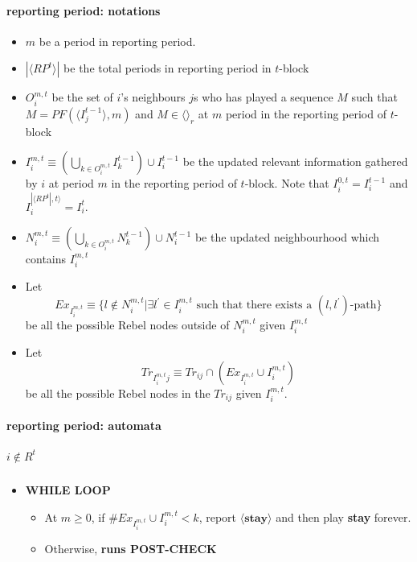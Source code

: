 \documentclass[12pt,letter]{article}
\theoremstyle{definition}
\theoremstyle{remark}
\theoremstyle{claim}
\begin{document}
\paragraph{reporting period: notations}
\begin{itemize}
\item $m$ be a period in reporting period.
\item $|\langle RP^t \rangle|$ be the total periods in reporting period in $t$-block
\item $O^{m,t}_i$ be the set of $i$'s neighbours $j$s who has played a sequence $M$ such that $M=PF(\langle I^{t-1}_j \rangle,m)$ and $M \in \langle \rangle_r$ at $m$ period in the reporting period of $t$-block 
\item $I^{m,t}_i\equiv (\bigcup_{k\in O^{m,t}_i} I^{t-1}_k)\cup I^{t-1}_i$ be the updated relevant information gathered by $i$ at period $m$ in the reporting period of $t$-block. Note that $I^{0,t}_i=I^{t-1}_i$ and $I^{|\langle RP^t|,t \rangle}_i=I^{t}_i$.
\item $N^{m,t}_i\equiv (\bigcup_{k\in O^{m,t}_i} N^{t-1}_k)\cup N^{t-1}_i$
be the updated neighbourhood which contains $I^{m,t}_i$

\item Let 
\[Ex_{I^{m,t}_i}\equiv \{l\notin N^{m,t}_i|\exists l^{'}\in I^{m,t}_i\text{ such that there exists a $(l,l^{'})$-path}\}\]
be all the possible Rebel nodes outside of $N^{m,t}_i$ given $I^{m,t}_i$
\item Let
\[Tr_{I^{m,t}_ij}\equiv Tr_{ij}\cap (Ex_{I^{m,t}_i}\cup I^{m,t}_i)\]
be all the possible Rebel nodes in the $Tr_{ij}$ given $I^{m,t}_i$. 
\end{itemize}
\paragraph{reporting period: automata}
\subparagraph{$i\notin R^{t}$}




\begin{itemize}
\item \textbf{WHILE LOOP}
\begin{itemize}
\item At $m\geq 0$, if $\#Ex_{I^{m,t}_i}\cup I^{m,t}_i< k$, report $\langle \textbf{stay} \rangle$ and then play \textbf{stay} forever.
\item Otherwise, \textbf{runs POST-CHECK }
\end{itemize}
\end{itemize}
\end{document}
